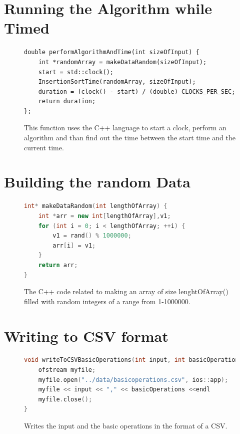 \documentclass[12pt]{article}
\begin{document}
\begin{appendices}
\section{Running the Algorithm while Timed}
\begin{figure}[h]
\begin{lstlisting}
double performAlgorithmAndTime(int sizeOfInput) {
	int *randomArray = makeDataRandom(sizeOfInput);
	start = std::clock();
	InsertionSortTime(randomArray, sizeOfInput);
	duration = (clock() - start) / (double) CLOCKS_PER_SEC;
	return duration;
};
\end{lstlisting}
\caption{\label{perform-algo-and-time} This function uses the C++ language to start a clock, perform an algorithm and than find out the time between the start time and the current time.}
\end{figure}
\newpage

\section{Building the random Data}
\begin{figure}[h]
\begin{lstlisting}[language=C++, breaklines=true]
int* makeDataRandom(int lengthOfArray) {
	int *arr = new int[lengthOfArray],v1;
	for (int i = 0; i < lengthOfArray; ++i) {
		v1 = rand() % 1000000;
		arr[i] = v1;
	}
	return arr;
}
\end{lstlisting}
\caption{\label{make-data-random}The C++ code related to making an array of size lenghtOfArray() filled with random integers of a range from 1-1000000.}
\end{figure}

\newpage

\section{Writing to CSV format}
\label{write-csv-bo}
\begin{figure}[h]
\begin{lstlisting}[language=C++, breaklines=true]
void writeToCSVBasicOperations(int input, int basicOperations){
	ofstream myfile;
	myfile.open("../data/basicoperations.csv", ios::app);
	myfile << input << "," << basicOperations <<endl
	myfile.close();
}
\end{lstlisting}
\caption{\label{write-to-csv-basic-operations} Writes the input and the basic operations in the format of a CSV.}
\end{figure}


\end{appendices}
\end{document}
